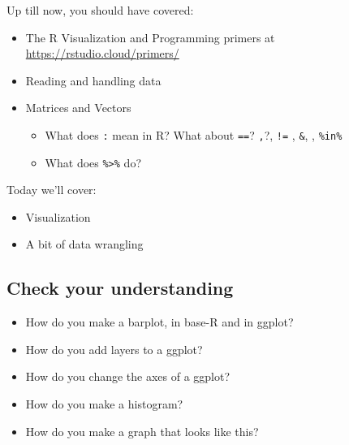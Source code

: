 \documentclass[]{book}
\providecommand{\tightlist}{%
  \setlength{\itemsep}{0pt}\setlength{\parskip}{0pt}}
\theoremstyle{definition}
\theoremstyle{definition}
\theoremstyle{definition}
\theoremstyle{remark}
\begin{document}
Up till now, you should have covered:

\begin{itemize}
\tightlist
\item
  The R Visualization and Programming primers at \url{https://rstudio.cloud/primers/}
\item
  Reading and handling data
\item
  Matrices and Vectors

  \begin{itemize}
  \tightlist
  \item
    What does \texttt{:} mean in R? What about \texttt{==}? \texttt{,}?, \texttt{!=} , \texttt{\&}, \texttt{\textbar{}}, \texttt{\%in\%}
  \item
    What does \texttt{\%\textgreater{}\%} do?
  \end{itemize}
\end{itemize}

Today we'll cover:

\begin{itemize}
\tightlist
\item
  Visualization
\item
  A bit of data wrangling
\end{itemize}

\hypertarget{check-your-understanding-1}{%
\subsection*{Check your understanding}\label{check-your-understanding-1}}

\begin{itemize}
\tightlist
\item
  How do you make a barplot, in base-R and in ggplot?
\item
  How do you add layers to a ggplot?
\item
  How do you change the axes of a ggplot?
\item
  How do you make a histogram?
\item
  How do you make a graph that looks like this?
\end{itemize}
\end{document}
